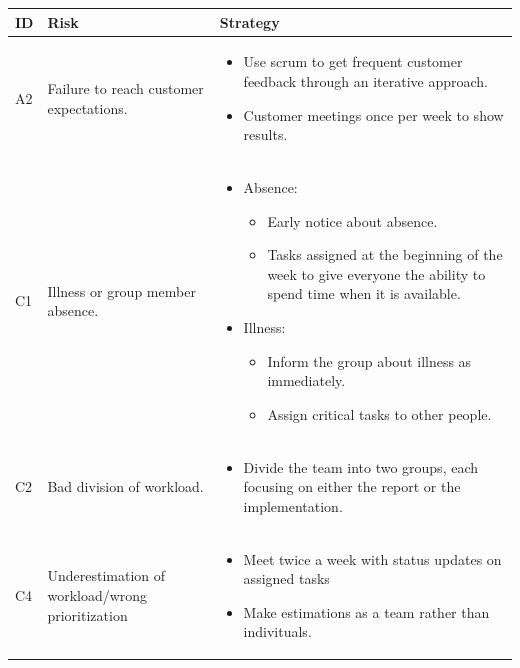 \begin{tabular}{|l|p{25mm}|p{70mm}|}
    \cellcolor{gray!25} \textbf{ID} & \cellcolor{gray!25} \textbf{Risk} & \cellcolor{gray!25} \textbf{Strategy} \\
    \hline
    A2 & Failure to reach customer expectations. & 
      \begin{itemize}
        \item Use scrum to get frequent customer feedback through an iterative approach.
        \item Customer meetings once per week to show results.
      \end{itemize} \\
    C1 & Illness or group member absence. &
      \begin{itemize}
        \item Absence:
          \begin{itemize}
            \item Early notice about absence.
            \item Tasks assigned at the beginning of the week to give everyone the ability to spend time when it is available.
          \end{itemize}
        \item Illness:
          \begin{itemize}
            \item Inform the group about illness as immediately.
            \item Assign critical tasks to other people.
          \end{itemize}
      \end{itemize} \\
    C2 & Bad division of workload. &
      \begin{itemize}
        \item Divide the team into two groups, each focusing on either the report or the implementation.
      \end{itemize} \\
    C4 & Underestimation of workload/wrong prioritization &
      \begin{itemize}
        \item Meet twice a week with status updates on assigned tasks
        \item Make estimations as a team rather than indivituals.
      \end{itemize}
\end{tabular}

